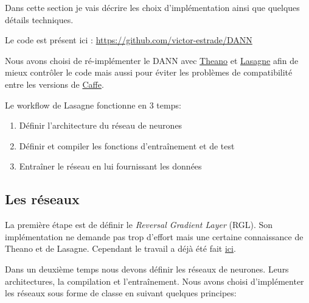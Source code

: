 
Dans cette section je vais décrire les choix d'implémentation ainsi que 
quelques détails techniques.

Le code est présent ici : \url{https://github.com/victor-estrade/DANN}

Nous avons choisi de ré-implémenter le DANN avec 
\href{http://deeplearning.net/software/theano/}{Theano}
et \href{http://lasagne.readthedocs.org/en/latest/index.html}{Lasagne}
afin de mieux contrôler le code mais aussi pour éviter les problèmes de 
compatibilité entre les versions de \href{http://caffe.berkeleyvision.org/}{Caffe}.

Le workflow de Lasagne fonctionne en 3 temps:
\begin{enumerate}
	\item Définir l'architecture du réseau de neurones
	\item Définir et compiler les fonctions d'entraînement et de test
	\item Entraîner le réseau en lui fournissant les données
\end{enumerate}

\subsection{Les réseaux} %
\label{sub:les_reseaux}

La première étape est de définir le \emph{Reversal Gradient Layer} (RGL).
Son implémentation ne demande pas trop d'effort mais une certaine connaissance
de Theano et de Lasagne. Cependant le travail a déjà été fait
\href{http://stackoverflow.com/questions/33879736/can-i-selectively-invert-theano-gradients-during-backpropagation}{ici}.

Dans un deuxième temps nous devons définir les réseaux de neurones. Leurs
architectures, la compilation et l'entraînement. Nous avons choisi 
d'implémenter les réseaux sous forme de classe en suivant quelques principes:

